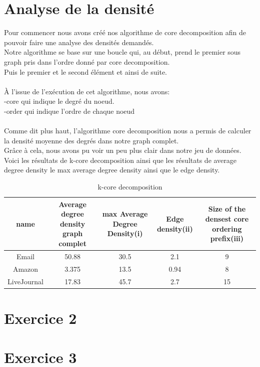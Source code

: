 \documentclass[a4paper,10pt]{report}
\begin{document}
\section{Analyse de la densité}
Pour commencer nous avons créé nos algorithme de core decomposition afin de pouvoir faire une analyse des densités demandés.
\\
Notre algorithme se base sur une boucle qui, au début, prend le premier sous graph pris dans l'ordre donné par core decomposition.\\
Puis le premier et le second élément et ainsi de suite.
\\
\\
À l'issue de l'exécution de cet algorithme, nous avons:\\
\indent -core qui indique le degré du noeud.\\
\indent -order qui indique l'ordre de chaque noeud
        \\
        \\
Comme dit plus haut, l'algorithme core decomposition nous a permis de calculer la densité moyenne des degrés dans notre graph complet.
\\
Grâce à cela, nous avons pu voir un peu plus clair dans notre jeu de données.
\clearpage
Voici les résultats de k-core decomposition ainsi que les résultats de average degree density le max average degree density ainsi que le edge density.
\begin{table}[ht]
\caption{k-core decomposition}
\centering
\begin{tabular}{|c c c c c|}
\hline\hline
name & Average degree density graph complet & max Average Degree Density(i) & Edge density(ii) & Size of the densest core ordering prefix(iii) \\[0.5ex]
\hline

Email & 50.88 & 30.5 & 2.1 & 9 \\
Amazon & 3.375 & 13.5 & 0.94 & 8 \\
LiveJournal & 17.83 & 45.7 & 2.7 & 15  \\

\hline
\end{tabular}
\label {table:nonlin}
\end{table}

\section{Exercice 2}

\section{Exercice 3}
\end{document}
